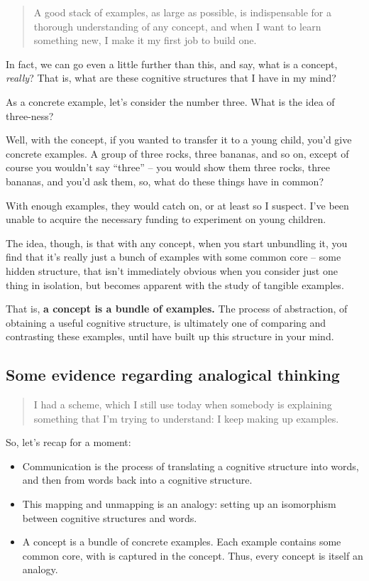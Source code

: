 \begin{quote}
A good stack of examples, as large as possible, is indispensable for a thorough
understanding of any concept, and when I want to learn something new, I make it
my first job to build one.
\end{quote}

In fact, we can go even a little further than this, and say, what is a
concept, \emph{really}? That is, what are these cognitive structures
that I have in my mind?

As a concrete example, let's consider the number three. What is the idea
of three-ness?

Well, with the concept, if you wanted to transfer it to a young child,
you'd give concrete examples. A group of three rocks, three bananas, and
so on, except of course you wouldn't say ``three'' -- you would show
them three rocks, three bananas, and you'd ask them, so, what do these
things have in common?

With enough examples, they would catch on, or at least so I suspect.
I've been unable to acquire the necessary funding to experiment on young
children.

The idea, though, is that with any concept, when you start unbundling
it, you find that it's really just a bunch of examples with some common
core -- some hidden structure, that isn't immediately obvious when you
consider just one thing in isolation, but becomes apparent with the
study of tangible examples.

That is, \textbf{a concept is a bundle of examples.} The process of
abstraction, of obtaining a useful cognitive structure, is ultimately
one of comparing and contrasting these examples, until have built up
this structure in your mind.

\subsection{Some evidence regarding analogical
  thinking}\label{some-evidence-regarding-analogical-thinking}

\begin{quote}
I had a scheme, which I still use today when somebody is explaining something
that I'm trying to understand: I keep making up examples.
\end{quote}

So, let's recap for a moment:

\begin{itemize}
\itemsep1pt\parskip0pt
\item
  Communication is the process of translating a cognitive structure into
  words, and then from words back into a cognitive structure.
\item
  This mapping and unmapping is an analogy: setting up an isomorphism
  between cognitive structures and words.
\item
  A concept is a bundle of concrete examples. Each example contains some
  common core, with is captured in the concept. Thus, every concept is
  itself an analogy.
\end{itemize}

